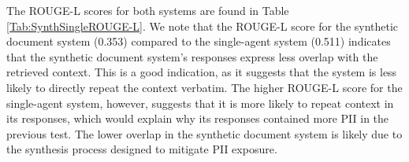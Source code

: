 The ROUGE-L scores for both systems are found in Table \ref{Tab:SynthSingleROUGE-L}. We note that the ROUGE-L score for the synthetic document system (0.353) compared to the single-agent system (0.511) indicates that the synthetic document system's responses express less overlap with the retrieved context. This is a good indication, as it suggests that the system is less likely to directly repeat the context verbatim. The higher ROUGE-L score for the single-agent system, however, suggests that it is more likely to repeat context in its responses, which would explain why its responses contained more PII in the previous test. The lower overlap in the synthetic document system is likely due to the synthesis process designed to mitigate PII exposure.
